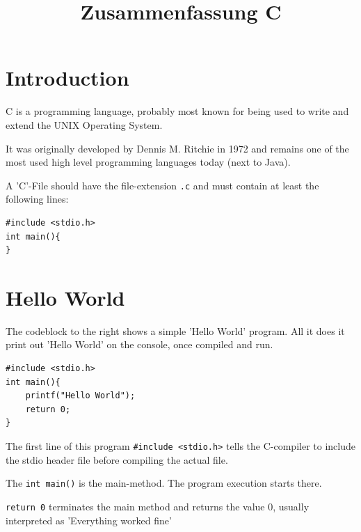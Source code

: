 \documentclass[a4paper, 11pt]{article}
\newcommand{\code}[1]{\texttt{#1}}
\begin{document}
\title{Zusammenfassung C}
\maketitle

\tableofcontents

\newpage

\section{Introduction}

C is a programming language, probably most known for being used to write and extend the UNIX Operating System.

It was originally developed by Dennis M. Ritchie in 1972 and remains one of the most used high level programming languages today (next to Java).

A 'C'-File should have the file-extension \code{.c} and must contain at least the following lines:

\begin{verbatim}
#include <stdio.h>
int main(){
}
\end{verbatim}

\section{Hello World}
\begin{minipage}{0.6\textwidth}
    The codeblock to the right shows a simple 'Hello World' program. All it does it print out 'Hello World' on the console, once compiled and run.
\end{minipage}\hfill
\begin{minipage}{0.35\textwidth}
    \begin{verbatim}
#include <stdio.h>
int main(){
    printf("Hello World");
    return 0;
}
    \end{verbatim}
\end{minipage}

The first line of this program \code{\#include <stdio.h>} tells the C-compiler to include the stdio header file before compiling the actual file.

The \code{int main()} is the main-method. The program execution starts there.

\code{return 0} terminates the main method and returns the value 0, usually interpreted as 'Everything worked fine'

\vspace{10px}
\end{document}
